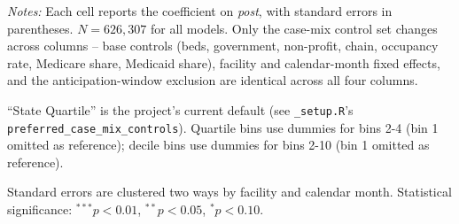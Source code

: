 \documentclass[12pt]{article}
\begin{document}
\begin{table}[H]
\begin{threeparttable}
\begin{tablenotes}[flushleft]
\footnotesize
\item \textit{Notes:} Each cell reports the coefficient on \textit{post}, with standard errors in parentheses. $N = 626,307$ for all models. Only the case-mix control set changes across columns -- base controls (beds, government, non-profit, chain, occupancy rate, Medicare share, Medicaid share), facility and calendar-month fixed effects, and the anticipation-window exclusion are identical across all four columns.
\item ``State Quartile'' is the project's current default (see \texttt{\_setup.R}'s \texttt{preferred\_case\_mix\_controls}). Quartile bins use dummies for bins 2-4 (bin 1 omitted as reference); decile bins use dummies for bins 2-10 (bin 1 omitted as reference).
\item Standard errors are clustered two ways by facility and calendar month. Statistical significance: $^{***}p<0.01$, $^{**}p<0.05$, $^{*}p<0.10$.
\end{tablenotes}
\end{threeparttable}
\end{table}
\end{document}
